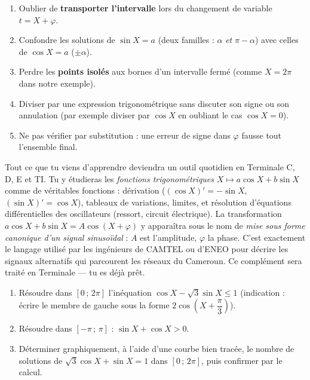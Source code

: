 \documentclass[11pt]{article}
\begin{document}
\begin{attention}
\begin{enumerate}
\item Oublier de \textbf{transporter l'intervalle} lors du changement de variable $t = X + \varphi$.
\item Confondre les solutions de $\sin X = a$ (deux familles : $\alpha$ \emph{et} $\pi - \alpha$) avec celles de $\cos X = a$ ($\pm\alpha$).
\item Perdre les \textbf{points isolés} aux bornes d'un intervalle fermé (comme $X = 2\pi$ dans notre exemple).
\item Diviser par une expression trigonométrique sans discuter son signe ou son annulation (par exemple diviser par $\cos X$ en oubliant le cas $\cos X = 0$).
\item Ne pas vérifier par substitution : une erreur de signe dans $\varphi$ fausse tout l'ensemble final.
\end{enumerate}
\end{attention}

\begin{savaistu}[Et en Terminale ?]
Tout ce que tu viens d'apprendre deviendra un outil quotidien en Terminale C, D, E et TI. Tu y étudieras les \emph{fonctions trigonométriques} $X \mapsto a\cos X + b\sin X$ comme de véritables fonctions : dérivation ($(\cos X)' = -\sin X$, $(\sin X)' = \cos X$), tableaux de variations, limites, et résolution d'équations différentielles des oscillateurs (ressort, circuit électrique). La transformation $a\cos X + b\sin X = A\cos(X+\varphi)$ y apparaîtra sous le nom de \emph{mise sous forme canonique d'un signal sinusoïdal} : $A$ est l'amplitude, $\varphi$ la phase. C'est exactement le langage utilisé par les ingénieurs de CAMTEL ou d'ENEO pour décrire les signaux alternatifs qui parcourent les réseaux du Cameroun. Ce complément sera traité en Terminale — tu es déjà prêt.
\end{savaistu}

\begin{exercice}
\begin{enumerate}
\item Résoudre dans $[0\,;\,2\pi]$ l'inéquation $\cos X - \sqrt{3}\sin X \leq 1$ (indication : écrire le membre de gauche sous la forme $2\cos\left(X + \dfrac{\pi}{3}\right)$).
\item Résoudre dans $[-\pi\,;\,\pi]$ : $\sin X + \cos X > 0$.
\item Déterminer graphiquement, à l'aide d'une courbe bien tracée, le nombre de solutions de $\sqrt{3}\cos X + \sin X = 1$ dans $[0\,;\,2\pi]$, puis confirmer par le calcul.
\end{enumerate}
\end{exercice}
\end{document}
